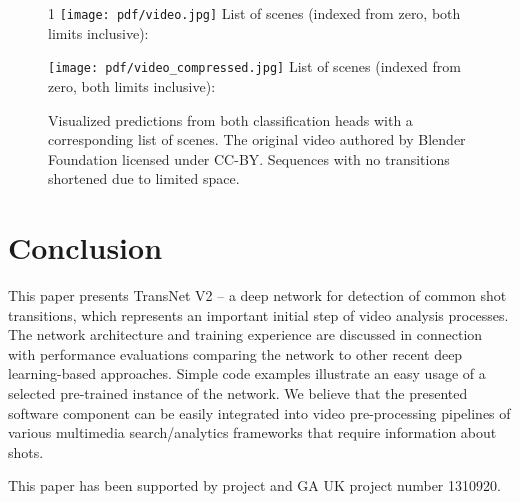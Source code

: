 \documentclass[sigconf]{acmart}
\def\longversion{1}
\begin{document}
\begin{figure}
    \centering
    \if\longversion1
        \texttt{[image: pdf/video.jpg]}
        List of scenes (indexed from zero, both limits inclusive):
        
    \else
        \texttt{[image: pdf/video\_compressed.jpg]}
        List of scenes (indexed from zero, both limits inclusive):
        
    \fi
    \caption{Visualized predictions from both classification heads with a corresponding list of scenes. The original video authored by Blender Foundation licensed under CC-BY. Sequences with no transitions shortened due to limited space.}
    \label{fig:example_predictions}
\end{figure}


\balance
\section{Conclusion}
This paper presents TransNet V2 -- a deep network for detection of common shot transitions, which represents an important initial step of video analysis processes. The network architecture and training experience are discussed in connection with performance evaluations comparing the network to other recent deep learning-based approaches. Simple code examples illustrate an easy usage of a selected pre-trained instance of the network. We believe that the presented software component can be easily integrated into video pre-processing pipelines of various multimedia search/analytics frameworks that require information about shots.

\begin{acks}
This paper has been supported by  project  and GA UK project number 1310920.
\end{acks}



\end{document}
